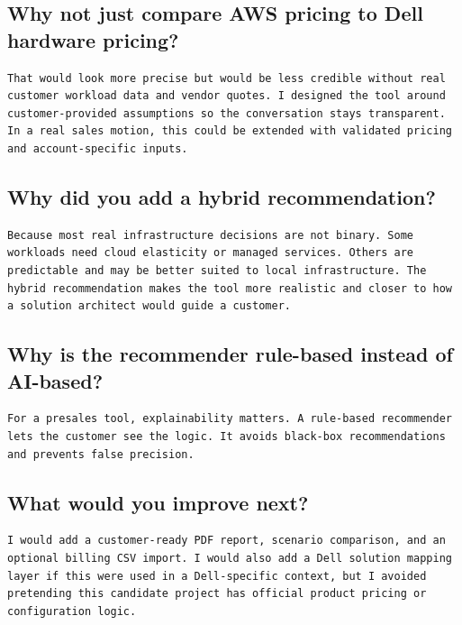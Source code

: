 \documentclass[11pt,a4paper]{article}
\begin{document}
\subsection{Why not just compare AWS pricing to Dell hardware pricing?}

\begin{lstlisting}
That would look more precise but would be less credible without real customer workload data and vendor quotes. I designed the tool around customer-provided assumptions so the conversation stays transparent. In a real sales motion, this could be extended with validated pricing and account-specific inputs.
\end{lstlisting}

\subsection{Why did you add a hybrid recommendation?}

\begin{lstlisting}
Because most real infrastructure decisions are not binary. Some workloads need cloud elasticity or managed services. Others are predictable and may be better suited to local infrastructure. The hybrid recommendation makes the tool more realistic and closer to how a solution architect would guide a customer.
\end{lstlisting}

\subsection{Why is the recommender rule-based instead of AI-based?}

\begin{lstlisting}
For a presales tool, explainability matters. A rule-based recommender lets the customer see the logic. It avoids black-box recommendations and prevents false precision.
\end{lstlisting}

\subsection{What would you improve next?}

\begin{lstlisting}
I would add a customer-ready PDF report, scenario comparison, and an optional billing CSV import. I would also add a Dell solution mapping layer if this were used in a Dell-specific context, but I avoided pretending this candidate project has official product pricing or configuration logic.
\end{lstlisting}
\end{document}
